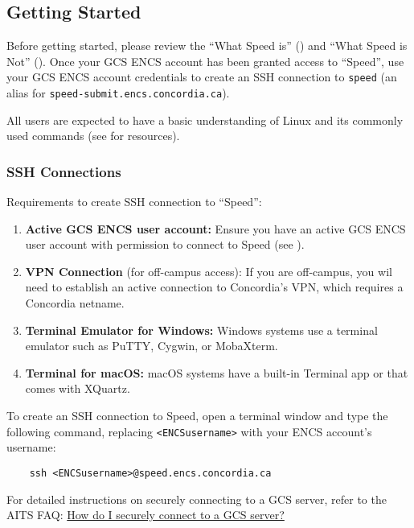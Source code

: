 \subsection{Getting Started}
\label{sect:getting-started}

Before getting started, please review the ``What Speed is'' ()
and ``What Speed is Not'' ().
Once your GCS ENCS account has been granted access to ``Speed'',
use your GCS ENCS account credentials to create an SSH connection to
\texttt{speed} (an alias for \texttt{speed-submit.encs.concordia.ca}).

All users are expected to have a basic understanding of
Linux and its commonly used commands (see  for resources).

\subsubsection{SSH Connections}
\label{sect:ssh-connection}

Requirements to create SSH connection to ``Speed'':
\begin{enumerate}
	\item \textbf{Active GCS ENCS user account:} Ensure you have an active GCS ENCS user account with
	permission to connect to Speed (see ).
	\item \textbf{VPN Connection} (for off-campus access): If you are off-campus, you wil need to establish an active connection to Concordia's VPN,
	which requires a Concordia netname.
	\item \textbf{Terminal Emulator for Windows:} Windows systems use a terminal emulator such as PuTTY, Cygwin, or MobaXterm.
	\item \textbf{Terminal for macOS:} macOS systems have a built-in Terminal app or  that comes with XQuartz.
\end{enumerate}

\noindent To create an SSH connection to Speed, open a terminal window and type the following command, replacing \verb!<ENCSusername>! with your ENCS account's username:
\begin{verbatim}
    ssh <ENCSusername>@speed.encs.concordia.ca
\end{verbatim}

\noindent For detailed instructions on securely connecting to a GCS server, refer to the AITS FAQ:
\href{https://www.concordia.ca/ginacody/aits/support/faq/ssh-to-gcs.html}{How do I securely connect to a GCS server?}

